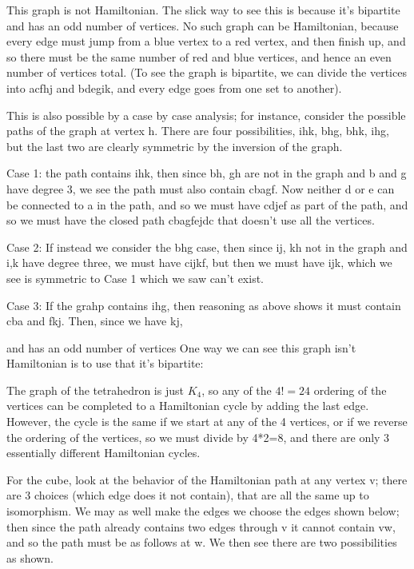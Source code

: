 \documentclass{amsart}
\begin{document}
This graph is not Hamiltonian.  The slick way to see this is because it's bipartite and has an odd number of vertices.  No such graph can be Hamiltonian, because every edge must jump from a blue vertex to a red vertex, and then finish up, and so there must be the same number of red and blue vertices, and hence an even number of vertices total.  (To see the graph is bipartite, we can divide the vertices into acfhj and bdegik, and every edge goes from one set to another).

This is also possible by a case by case analysis; for instance, consider the possible paths of the graph at vertex h.  There are four possibilities, ihk, bhg, bhk, ihg, but the last two are clearly symmetric by the inversion of the graph.

Case 1: the path contains ihk, then since bh, gh are not in the graph and b and g have degree 3, we see the path must also contain cbagf.  Now neither d or e can be connected to a in the path, and so we must have cdjef as part of the path, and so we must have the closed path cbagfejdc that doesn't use all the vertices.

Case 2: If instead we consider the bhg case, then since ij, kh not in the graph and i,k have degree three, we must have cijkf, but then we must have ijk, which we see is symmetric to Case 1 which we saw can't exist.

Case 3: If the grahp contains ihg, then reasoning as above shows it must contain cba and fkj.  Then, since we have kj, 



and has an odd number of vertices 
One way we can see this graph isn't Hamiltonian is to use that it's bipartite:  


The graph of the tetrahedron is just $K_4$, so any of the $4!=24$ ordering of the vertices can be completed to a Hamiltonian cycle by adding the last edge.  However, the cycle is the same if we start at any of the 4 vertices, or if we reverse the ordering of the vertices, so we must divide by 4*2=8, and there are only 3 essentially different Hamiltonian cycles.

For the cube, look at the behavior of the Hamiltonian path at any vertex v; there are 3 choices (which edge does it not contain), that are all the same up to isomorphism.  We may as well make the edges we choose the edges shown below; then since the path already contains two edges through v it cannot contain vw, and so the path must be as follows at w.  We then see there are two possibilities as shown.
\end{document}
